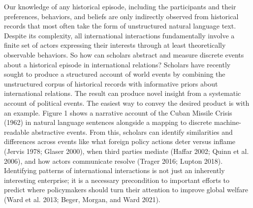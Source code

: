 \documentclass{article}
\begin{document}
Our knowledge of any historical episode, including the participants and
their preferences, behaviors, and beliefs are only indirectly observed
from historical records that most often take the form of unstructured
natural language text. Despite its complexity, all international
interactions fundamentally involve a finite set of actors expressing
their interests through at least theoretically observable behaviors. So
how can scholars abstract and measure discrete events about a historical
episode in international relations? Scholars have recently sought to
produce a structured account of world events by combining the
unstructured corpus of historical records with informative priors about
international relations. The result can produce novel insight from a
systematic account of political events. The easiest way to convey the
desired product is with an example. Figure 1 shows a narrative account
of the Cuban Missile Crisis (1962) in natural language sentences
alongside a mapping to discrete machine-readable abstractive events.
From this, scholars can identify similarities and differences across
events like what foreign policy actions deter versus inflame (Jervis
1978; Glaser 2000), when third parties mediate (Haffar 2002; Quinn et
al. 2006), and how actors communicate resolve (Trager 2016; Lupton
2018). Identifying patterns of international interactions is not just an
inherently interesting enterprise; it is a necessary precondition to
important efforts to predict where policymakers should turn their
attention to improve global welfare (Ward et al. 2013; Beger, Morgan,
and Ward 2021).
\end{document}
